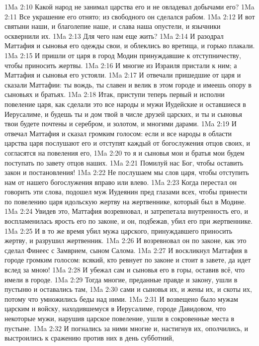 \vs 1Ma 2:10 Какой народ не занимал царства его и не овладевал добычами его?
\vs 1Ma 2:11 Все украшение его отнято; из свободного он сделался рабом.
\vs 1Ma 2:12 И вот святыни наши, и благолепие наше, и слава наша опустели, и язычники осквернили их.
\vs 1Ma 2:13 Для чего нам еще жить?
\vs 1Ma 2:14 И разодрал Маттафия и сыновья его одежды свои, и облеклись во вретища, и горько плакали.
\vs 1Ma 2:15 И пришли от царя в город Модин принуждавшие к отступничеству, чтобы приносить жертвы.
\vs 1Ma 2:16 И многие из Израиля пристали к ним; а Маттафия и сыновья его устояли.
\vs 1Ma 2:17 И отвечали пришедшие от царя и сказали Маттафии: ты вождь, ты славен и велик в этом городе и имеешь опору в сыновьях и братьях.
\vs 1Ma 2:18 Итак, приступи теперь первый и исполни повеление царя, как сделали это все народы и мужи Иудейские и оставшиеся в Иерусалиме, и будешь ты и дом твой в числе друзей царских, и ты и сыновья твои будете почтены и серебром, и золотом, и многими дарами.
\vs 1Ma 2:19 И отвечал Маттафия и сказал громким голосом: если и все народы в области царства царя послушают его и отступят каждый от богослужения отцов своих, и согласятся на повеления его,
\vs 1Ma 2:20 то я и сыновья мои и братья мои будем поступать по завету отцов наших.
\vs 1Ma 2:21 Помилуй нас Бог, чтобы оставить закон и постановления!
\vs 1Ma 2:22 Не послушаем мы слов царя, чтобы отступить нам от нашего богослужения вправо или влево.
\vs 1Ma 2:23 Когда перестал он говорить эти слова, подошел муж Иудеянин пред глазами всех, чтобы принести по повелению царя идольскую жертву на жертвеннике, который был в Модине.
\vs 1Ma 2:24 Увидев это, Маттафия возревновал, и затрепетала внутренность его, и воспламенилась ярость его по законе, и он, подбежав, убил его при жертвеннике.
\vs 1Ma 2:25 И в то же время убил мужа царского, принуждавшего приносить жертву, и разрушил жертвенник.
\vs 1Ma 2:26 И возревновал он по законе, как это сделал Финеес с Замврием, сыном Салома.
\vs 1Ma 2:27 И воскликнул Маттафия в городе громким голосом: всякий, кто ревнует по законе и стоит в завете, да идет вслед за мною!
\vs 1Ma 2:28 И убежал сам и сыновья его в горы, оставив всё, что имели в городе.
\vs 1Ma 2:29 Тогда многие, преданные правде и закону, ушли в пустыню и оставались там,
\vs 1Ma 2:30 сами и сыновья их, и жены их, и скоты их, потому что умножились беды над ними.
\vs 1Ma 2:31 И возвещено было мужам царским и войску, находившемуся в Иерусалиме, городе Давидовом, что некоторые мужи, нарушив царское повеление, ушли в сокровенные места в пустыне.
\vs 1Ma 2:32 И погнались за ними многие и, настигнув их, ополчились, и выстроились к сражению против них в день субботний,
